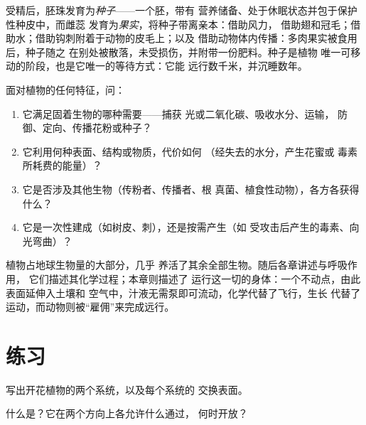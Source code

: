\begin{proposition}[果实与传播]\label{prop:g12:plant-rooted-life:dispersal}
受精后，胚珠发育为\emph{种子}——一个胚，带有
营养储备、处于休眠状态并包于保护性种皮中，而雌蕊
发育为\emph{果实}，将种子带离亲本：借助风力，
借助翅和冠毛；借助水；借助钩刺附着于动物的皮毛上；以及
借助动物体内传播：多肉果实被食用后，种子随之
在别处被散落，未受损伤，并附带一份肥料。种子是植物
唯一可移动的阶段，也是它唯一的等待方式：它能
远行数千米，并沉睡数年。
\end{proposition}
\admitted

\begin{method}[读懂固着生活的适应]\label{met:g12:plant-rooted-life:read}
面对植物的任何特征，问：
\begin{enumerate}
  \item 它满足固着生物的哪种需要——捕获
        光或二氧化碳、吸收水分、运输，
        防御、定向、传播花粉或种子？
  \item 它利用何种表面、结构或物质，代价如何
        （经失去的水分，产生花蜜或
        毒素所耗费的能量）？
  \item 它是否涉及其他生物（传粉者、传播者、根
        真菌、植食性动物），各方各获得什么？
  \item 它是一次性建成（如树皮、刺），还是按需产生（如
        受攻击后产生的毒素、向光弯曲）？
\end{enumerate}
\end{method}

\begin{remark}[生命的一半在静止中]\label{rem:g12:plant-rooted-life:half}
植物占地球生物量的大部分，几乎
养活了其余全部生物。随后各章讲述与呼吸作用，
它们描述其化学过程；本章则描述了
运行这一切的身体：一个不动点，由此表面延伸入土壤和
空气中，汁液无需泵即可流动，化学代替了飞行，生长
代替了运动，而动物则被“雇佣”来完成远行。
\end{remark}

\section{练习}

\begin{exercise}[$\star$]\label{exo:g12:plant-rooted-life:1}
写出开花植物的两个系统，以及每个系统的
交换表面。
\end{exercise}

\begin{exercise}[$\star$]\label{exo:g12:plant-rooted-life:2}
什么是？它在两个方向上各允许什么通过，
何时开放？
\end{exercise}

